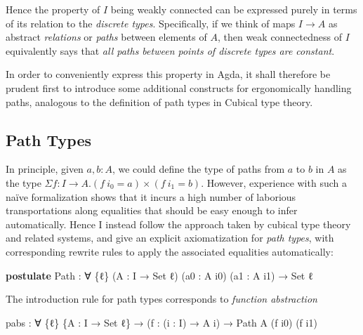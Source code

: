\documentclass[
  12pt]{article}
\newenvironment{Shaded}{\begin{snugshade}}{\end{snugshade}}
\newcommand{\DataTypeTok}[1]{\textcolor[rgb]{0.00,0.34,0.68}{#1}}
\newcommand{\KeywordTok}[1]{\textcolor[rgb]{0.12,0.11,0.11}{\textbf{#1}}}
\newcommand{\NormalTok}[1]{\textcolor[rgb]{0.12,0.11,0.11}{#1}}
\newcommand{\OtherTok}[1]{\textcolor[rgb]{0.00,0.43,0.16}{#1}}
\begin{document}
Hence the property of \(I\) being weakly connected can be expressed
purely in terms of its relation to the \emph{discrete types}.
Specifically, if we think of maps \(I \to A\) as abstract
\emph{relations} or \emph{paths} between elements of \(A\), then weak
connectedness of \(I\) equivalently says that \emph{all paths between
points of discrete types are constant}.

In order to conveniently express this property in Agda, it shall
therefore be prudent first to introduce some additional constructs for
ergonomically handling paths, analogous to the definition of path types
in Cubical type theory.

\subsection{Path Types}\label{path-types}

In principle, given \(a,b : A\), we could define the type of paths from
\(a\) to \(b\) in \(A\) as the type
\(\Sigma f : I \to A . (f ~ i_0 = a) \times (f ~ i_1 = b)\). However,
experience with such a naïve formalization shows that it incurs a high
number of laborious transportations along equalities that should be easy
enough to infer automatically. Hence I instead follow the approach taken
by cubical type theory and related systems, and give an explicit
axiomatization for \emph{path types}, with corresponding rewrite rules
to apply the associated equalities automatically:

\begin{Shaded}
\begin{Highlighting}[]
\KeywordTok{postulate}
\NormalTok{    Path }\OtherTok{:} \OtherTok{∀} \OtherTok{\{}\NormalTok{ℓ}\OtherTok{\}} \OtherTok{(}\NormalTok{A }\OtherTok{:}\NormalTok{ I }\OtherTok{→} \DataTypeTok{Set}\NormalTok{ ℓ}\OtherTok{)} \OtherTok{(}\NormalTok{a0 }\OtherTok{:}\NormalTok{ A i0}\OtherTok{)} \OtherTok{(}\NormalTok{a1 }\OtherTok{:}\NormalTok{ A i1}\OtherTok{)} \OtherTok{→} \DataTypeTok{Set}\NormalTok{ ℓ}
\end{Highlighting}
\end{Shaded}

The introduction rule for path types corresponds to \emph{function
abstraction}

\begin{Shaded}
\begin{Highlighting}[]
\NormalTok{    pabs }\OtherTok{:} \OtherTok{∀} \OtherTok{\{}\NormalTok{ℓ}\OtherTok{\}} \OtherTok{\{}\NormalTok{A }\OtherTok{:}\NormalTok{ I }\OtherTok{→} \DataTypeTok{Set}\NormalTok{ ℓ}\OtherTok{\}} 
           \OtherTok{→} \OtherTok{(}\NormalTok{f }\OtherTok{:} \OtherTok{(}\NormalTok{i }\OtherTok{:}\NormalTok{ I}\OtherTok{)} \OtherTok{→}\NormalTok{ A i}\OtherTok{)} \OtherTok{→}\NormalTok{ Path A }\OtherTok{(}\NormalTok{f i0}\OtherTok{)} \OtherTok{(}\NormalTok{f i1}\OtherTok{)}
\end{Highlighting}
\end{Shaded}
\end{document}
